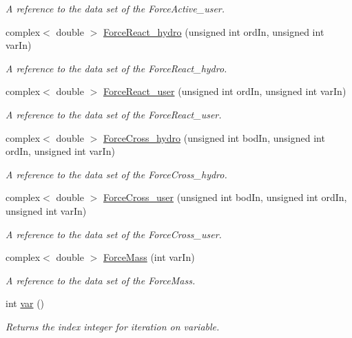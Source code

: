 \begin{DoxyCompactItemize}
\begin{DoxyCompactList}\small\item\em A reference to the data set of the Force\-Active\-\_\-user. \end{DoxyCompactList}\item 
complex$<$ double $>$ \hyperlink{class_equationof_motion_a4962df48c786fced4e953e50f1d82a3a}{Force\-React\-\_\-hydro} (unsigned int ord\-In, unsigned int var\-In)
\begin{DoxyCompactList}\small\item\em A reference to the data set of the Force\-React\-\_\-hydro. \end{DoxyCompactList}\item 
complex$<$ double $>$ \hyperlink{class_equationof_motion_ac1f572e423c09b9e9fa955f52434a8f7}{Force\-React\-\_\-user} (unsigned int ord\-In, unsigned int var\-In)
\begin{DoxyCompactList}\small\item\em A reference to the data set of the Force\-React\-\_\-user. \end{DoxyCompactList}\item 
complex$<$ double $>$ \hyperlink{class_equationof_motion_af1d1f42b77561e9f1c4110e16af309da}{Force\-Cross\-\_\-hydro} (unsigned int bod\-In, unsigned int ord\-In, unsigned int var\-In)
\begin{DoxyCompactList}\small\item\em A reference to the data set of the Force\-Cross\-\_\-hydro. \end{DoxyCompactList}\item 
complex$<$ double $>$ \hyperlink{class_equationof_motion_a3b06b1ff4b792ad3a3d3c0274426d5ed}{Force\-Cross\-\_\-user} (unsigned int bod\-In, unsigned int ord\-In, unsigned int var\-In)
\begin{DoxyCompactList}\small\item\em A reference to the data set of the Force\-Cross\-\_\-user. \end{DoxyCompactList}\item 
complex$<$ double $>$ \hyperlink{class_equationof_motion_a848b45b70d29d793b86a7c1ca8f97ed6}{Force\-Mass} (int var\-In)
\begin{DoxyCompactList}\small\item\em A reference to the data set of the Force\-Mass. \end{DoxyCompactList}\item 
int \hyperlink{class_equationof_motion_ab69511cc5037376cf7da80ce30d9eaab}{var} ()
\begin{DoxyCompactList}\small\item\em Returns the index integer for iteration on variable. \end{DoxyCompactList}\item 

\end{DoxyCompactItemize}
